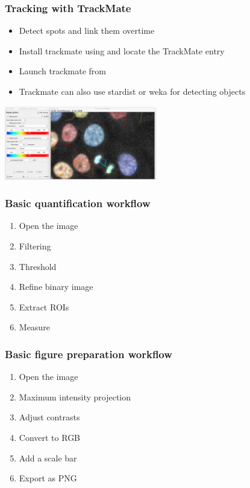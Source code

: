 \documentclass[ignorenonframetext,aspectratio=169,10pt,xcolor=table]{beamer}
\begin{document}
\begin{frame} \frametitle{Tracking with TrackMate}
  \begin{itemize}
  \item Detect spots and link them overtime
  \item Install trackmate using  and locate the
    TrackMate entry
  \item Launch trackmate from 
  \item Trackmate can also use stardist or weka for detecting objects
  \end{itemize}
  \begin{center} \includegraphics[width=0.5\textwidth]{trackmate}
  \end{center}
\end{frame}

\begin{frame} \frametitle{Basic quantification workflow}
  \begin{enumerate}
  \item Open the image
  \item Filtering
  \item Threshold
  \item Refine binary image
  \item Extract ROIs
  \item Measure
  \end{enumerate}
\end{frame}

\begin{frame} \frametitle{Basic figure preparation workflow}
  \begin{enumerate}
  \item Open the image
  \item Maximum intensity projection
  \item Adjust contrasts
  \item Convert to RGB
  \item Add a scale bar
  \item Export as PNG
  \end{enumerate}
\end{frame}
\end{document}

